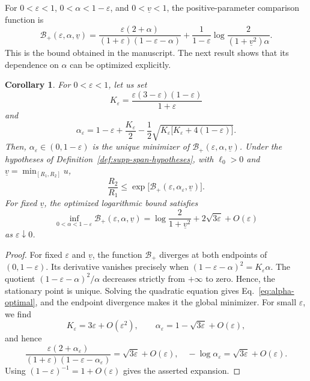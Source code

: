 \documentclass[11pt,a4paper]{article}
\numberwithin{equation}{section}
\theoremstyle{plain}
\newtheorem{corollary}{Corollary}
\theoremstyle{definition}
\theoremstyle{remark}
\newcommand{\ellzero}{\ell_0}
\begin{document}
For $0<\varepsilon<1$, $0<\alpha<1-\varepsilon$, and $0<\underline v<1$, the positive-parameter comparison function is
\begin{equation}\label{eq:supp-positive-comparison}
\mathcal B_+(\varepsilon,\alpha,\underline v)=\frac{\varepsilon(2+\alpha)}{(1+\varepsilon)(1-\varepsilon-\alpha)}+\frac{1}{1-\varepsilon}\log\frac{2}{(1+\underline v^2)\alpha}.
\end{equation}
This is the bound obtained in the manuscript. The next result shows that its dependence on $\alpha$ can be optimized explicitly.
\begin{corollary}\label{cor:optimized-approx-flat-span}
For $0<\varepsilon<1$, let us set
\begin{equation}\label{eq:K-epsilon}
K_\varepsilon=\frac{\varepsilon(3-\varepsilon)(1-\varepsilon)}{1+\varepsilon}
\end{equation}
and
\begin{equation}\label{eq:alpha-optimal}
\alpha_\varepsilon=1-\varepsilon+\frac{K_\varepsilon}{2}
-\frac12\sqrt{K_\varepsilon\bigl[K_\varepsilon+4(1-\varepsilon)\bigr]}.
\end{equation}
Then, $\alpha_\varepsilon\in(0,1-\varepsilon)$ is the unique minimizer of $\mathcal B_+(\varepsilon,\alpha,\underline v)$. Under the hypotheses of Definition~\ref{def:supp-span-hypotheses}, with $\ellzero>0$ and $\underline v=\min_{[R_1,R_2]}u$,
\begin{equation}\label{eq:optimized-positive-l-ratio}
\frac{R_2}{R_1}\leqslant
\exp\bigl[\mathcal B_+(\varepsilon,\alpha_\varepsilon,\underline v)\bigr].
\end{equation}
For fixed $\underline v$, the optimized logarithmic bound satisfies
\begin{equation}\label{eq:optimized-small-epsilon-expansion}
\inf_{0<\alpha<1-\varepsilon}
\mathcal B_+(\varepsilon,\alpha,\underline v)
=\log\frac{2}{1+\underline v^2}
+2\sqrt{3\varepsilon}+O(\varepsilon)
\end{equation}
as $\varepsilon\downarrow 0$.
\end{corollary}
\begin{proof}
For fixed $\varepsilon$ and $\underline v$, the function $\mathcal B_+$ diverges at both endpoints of $(0,1-\varepsilon)$. Its derivative vanishes precisely when $(1-\varepsilon-\alpha)^2=K_\varepsilon\alpha$. The quotient $(1-\varepsilon-\alpha)^2/\alpha$ decreases strictly from $+\infty$ to zero. Hence, the stationary point is unique. Solving the quadratic equation gives Eq.~\eqref{eq:alpha-optimal}, and the endpoint divergence makes it the global minimizer. For small $\varepsilon$, we find
\begin{equation}
K_\varepsilon=3\varepsilon+O(\varepsilon^2),\qquad
\alpha_\varepsilon=1-\sqrt{3\varepsilon}+O(\varepsilon),
\end{equation}
and hence
\begin{equation}
\frac{\varepsilon(2+\alpha_\varepsilon)}
{(1+\varepsilon)(1-\varepsilon-\alpha_\varepsilon)}=\sqrt{3\varepsilon}+O(\varepsilon),\quad
-\log\alpha_\varepsilon=\sqrt{3\varepsilon}+O(\varepsilon).
\end{equation}
Using $(1-\varepsilon)^{-1}=1+O(\varepsilon)$ gives the asserted expansion.
\end{proof}
\end{document}
